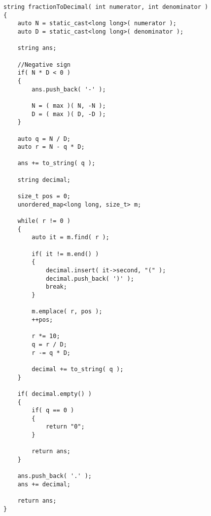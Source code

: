 \setcounter{lstlisting}{0}
\begin{lstlisting}[style=customc, caption={Source Code}]
string fractionToDecimal( int numerator, int denominator )
{
    auto N = static_cast<long long>( numerator );
    auto D = static_cast<long long>( denominator );

    string ans;

	//Negative sign
    if( N * D < 0 )
    {
        ans.push_back( '-' );

        N = ( max )( N, -N );
        D = ( max )( D, -D );
    }

    auto q = N / D;
    auto r = N - q * D;

    ans += to_string( q );

    string decimal;

    size_t pos = 0;
    unordered_map<long long, size_t> m;

    while( r != 0 )
    {
        auto it = m.find( r );

        if( it != m.end() )
        {
            decimal.insert( it->second, "(" );
            decimal.push_back( ')' );
            break;
        }

        m.emplace( r, pos );
        ++pos;

        r *= 10;
        q = r / D;
        r -= q * D;

        decimal += to_string( q );
    }

    if( decimal.empty() )
    {
        if( q == 0 )
        {
            return "0";
        }

        return ans;
    }

    ans.push_back( '.' );
    ans += decimal;

    return ans;
}
\end{lstlisting}